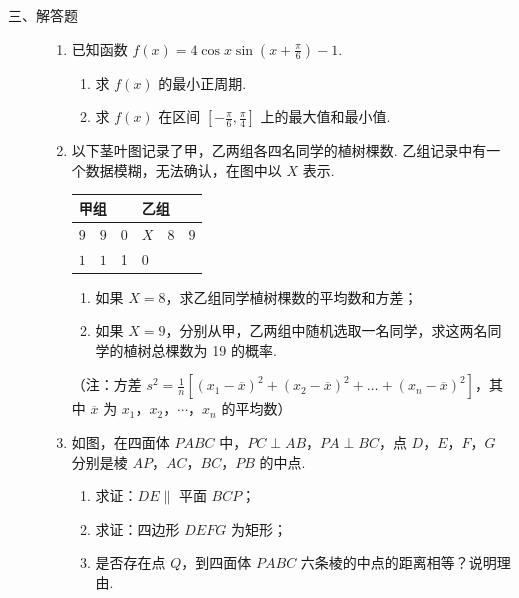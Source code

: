 \begin{description}

    \item[三、解答题]

    \begin{enumerate}[leftmargin=5pt]

      \addtocounter{enumi}{+14}

        \item 已知函数 \( f(x) = 4\cos x\sin \left(x + \frac{\pi}{6}\right) - 1 \).
\begin{enumerate}
\item 求 \( f(x) \) 的最小正周期.
\item 求 \( f(x) \) 在区间 \( \left[-\frac{\pi}{6}, \frac{\pi}{4}\right] \) 上的最大值和最小值.
\end{enumerate}

        \item 以下茎叶图记录了甲，乙两组各四名同学的植树棵数. 乙组记录中有一个数据模糊，无法确认，在图中以 \(X\) 表示.

\begin{center}
\begin{tabular}{r|c|l}
甲组 & & 乙组 \\
\hline
\(9\quad 9\) & 0 & \(X\quad 8\quad 9\) \\
\(1\quad 1\) & 1 & \(0\)
\end{tabular}
\end{center}

\begin{enumerate}
\item 如果 \(X = 8\)，求乙组同学植树棵数的平均数和方差；
\item 如果 \(X = 9\)，分别从甲，乙两组中随机选取一名同学，求这两名同学的植树总棵数为 19 的概率.
\end{enumerate}
（注：方差 \( s^2 = \frac{1}{n}\left[(x_1 - \overline{x})^2 + (x_2 - \overline{x})^2 + \ldots + (x_n - \overline{x})^2\right] \)，其中 \(\overline{x}\) 为 \(x_1\)，\(x_2\)，\(\cdots\)，\(x_n\) 的平均数）

        \item 如图，在四面体 \(PABC\) 中，\(PC \perp AB\)，\(PA \perp BC\)，点 \(D\)，\(E\)，\(F\)，\(G\) 分别是棱 \(AP\)，\(AC\)，\(BC\)，\(PB\) 的中点.

\begin{enumerate}
\item 求证：\(DE \parallel\) 平面 \(BCP\)；
\item 求证：四边形 \(DEFG\) 为矩形；
\item 是否存在点 \(Q\)，到四面体 \(PABC\) 六条棱的中点的距离相等？说明理由.
\end{enumerate}


\end{enumerate}
\end{description}
